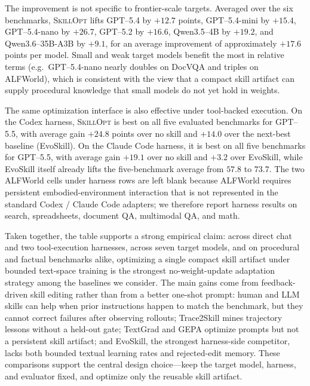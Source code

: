 \documentclass{llmxive}
\providecommand{\ourmethod}{\textsc{SkillOpt}\xspace}
\begin{document}
The improvement is not specific to frontier-scale targets. Averaged over the six benchmarks, \ourmethod{} lifts GPT--5.4 by $+12.7$ points, GPT--5.4-mini by $+15.4$, GPT--5.4-nano by $+26.7$, GPT--5.2 by $+16.6$, Qwen3.5--4B by $+19.2$, and Qwen3.6--35B-A3B by $+9.1$, for an average improvement of approximately $+17.6$ points per model. Small and weak target models benefit the most in relative terms (e.g.\ GPT--5.4-nano nearly doubles on DocVQA and triples on ALFWorld), which is consistent with the view that a compact skill artifact can supply procedural knowledge that small models do not yet hold in weights.

The same optimization interface is also effective under tool-backed execution. On the Codex harness, \ourmethod{} is best on all five evaluated benchmarks for GPT--5.5, with average gain $+24.8$ points over no skill and $+14.0$ over the next-best baseline (EvoSkill). On the Claude Code harness, it is best on all five benchmarks for GPT--5.5, with average gain $+19.1$ over no skill and $+3.2$ over EvoSkill, while EvoSkill itself already lifts the five-benchmark average from $57.8$ to $73.7$. The two ALFWorld cells under harness rows are left blank because ALFWorld requires persistent embodied-environment interaction that is not represented in the standard Codex / Claude Code adapters; we therefore report harness results on search, spreadsheets, document QA, multimodal QA, and math.

Taken together, the table supports a strong empirical claim: across direct chat and two tool-execution harnesses, across seven target models, and on procedural and factual benchmarks alike, optimizing a single compact skill artifact under bounded text-space training is the strongest no-weight-update adaptation strategy among the baselines we consider. The main gains come from feedback-driven skill editing rather than from a better one-shot prompt: human and LLM skills can help when prior instructions happen to match the benchmark, but they cannot correct failures after observing rollouts; Trace2Skill mines trajectory lessons without a held-out gate; TextGrad and GEPA optimize prompts but not a persistent skill artifact; and EvoSkill, the strongest harness-side competitor, lacks both bounded textual learning rates and rejected-edit memory. These comparisons support the central design choice---keep the target model, harness, and evaluator fixed, and optimize only the reusable skill artifact.
\end{document}
